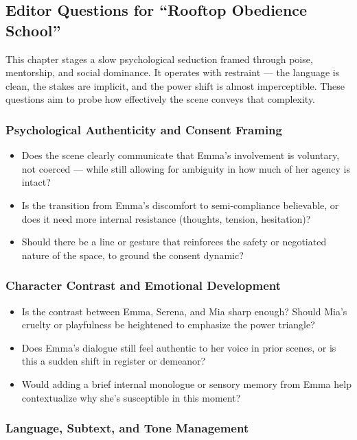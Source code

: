 \subsection*{Editor Questions for ``Rooftop Obedience School''}

This chapter stages a slow psychological seduction framed through poise, mentorship, and social dominance. It operates with restraint — the language is clean, the stakes are implicit, and the power shift is almost imperceptible. These questions aim to probe how effectively the scene conveys that complexity.

\subsubsection*{Psychological Authenticity and Consent Framing}

\begin{itemize}
  \item Does the scene clearly communicate that Emma’s involvement is voluntary, not coerced — while still allowing for ambiguity in how much of her agency is intact?
  \item Is the transition from Emma’s discomfort to semi-compliance believable, or does it need more internal resistance (thoughts, tension, hesitation)?
  \item Should there be a line or gesture that reinforces the safety or negotiated nature of the space, to ground the consent dynamic?
\end{itemize}

\subsubsection*{Character Contrast and Emotional Development}

\begin{itemize}
  \item Is the contrast between Emma, Serena, and Mia sharp enough? Should Mia’s cruelty or playfulness be heightened to emphasize the power triangle?
  \item Does Emma’s dialogue still feel authentic to her voice in prior scenes, or is this a sudden shift in register or demeanor?
  \item Would adding a brief internal monologue or sensory memory from Emma help contextualize why she’s susceptible in this moment?
\end{itemize}

\subsubsection*{Language, Subtext, and Tone Management}

